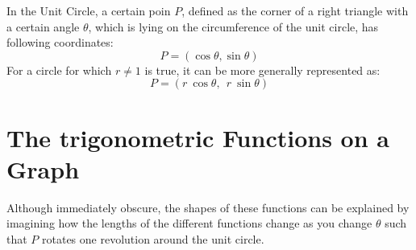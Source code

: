 \documentclass[a4paper, 12pt]{article}
\begin{document}
\bigbreak
In the Unit Circle, a certain poin $P$, defined as the corner of a right triangle with a certain angle $\theta$, which is lying on the circumference of the unit circle, has following coordinates:
$$P = (\cos \theta, \sin \theta)$$ \bigbreak
For a circle for which $r \neq 1$ is true, it can be more generally represented as:
$$P = (r \ \cos \theta, \ \ r \ \sin \theta)$$

\newpage

\section{The trigonometric Functions on a Graph}


 \bigbreak


Although immediately obscure, the shapes of these functions can be explained by
 imagining how the lengths of the different functions change as you change $\theta$ such that $P$ rotates one 
revolution around the unit circle.
\end{document}

